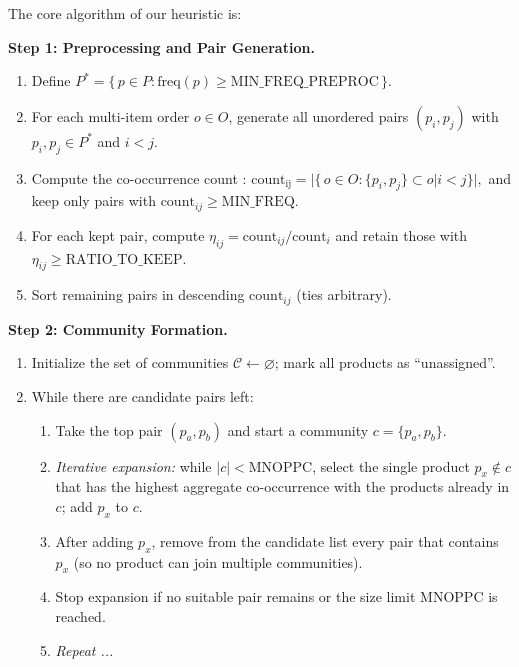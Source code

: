 \documentclass[preprint,review,11pt,authoryear]{elsarticle}
\begin{document}
\noindent The core algorithm of our heuristic is:

\begin{algorithm}[H]
\caption{Algorithm 1: Greedy Product Clustering and Station Assignment (CSLAP)}
\label{alg:greedy-cslap}
\begin{algorithmic}[1]

\Statex \textbf{Step 1: Preprocessing and Pair Generation.}
\begin{enumerate}[label=(\alph*)]
\item Define $P^*=\{\,p\in P:\mathrm{freq}(p)\ge \mathrm{MIN\_FREQ\_PREPROC}\,\}$.
\item For each multi-item order $o\in O$, generate all unordered pairs $(p_i,p_j)$ with $p_i,p_j\in P^*$ and $i<j$.
\item Compute the co-occurrence count : \(\mathrm{count_{ij}} = \big|\{\,o \in O : \{p_i,p_j\} \subset o | i < j \}\big|, \)
and keep only pairs with $\mathrm{count}_{ij}\ge \mathrm{MIN\_FREQ}$.
\item For each kept pair, compute $\eta_{ij}=\mathrm{count}_{ij}/\mathrm{count}_i$ and retain those with $\eta_{ij}\ge \mathrm{RATIO\_TO\_KEEP}$.
\item Sort remaining pairs in descending $\mathrm{count}_{ij}$ (ties arbitrary).
\end{enumerate}
\medskip
\textbf{Step 2: Community Formation.}
\begin{enumerate}[label=(\alph*)]
\item Initialize the set of communities $\mathcal{C}\leftarrow\varnothing$; mark all products as “unassigned”.
\item While there are candidate pairs left:
  \begin{enumerate}[label*=\arabic*.]
  \item Take the top pair $(p_a,p_b)$ and start a community $c=\{p_a,p_b\}$.
  \item \emph{Iterative expansion:} while $|c|<\mathrm{MNOPPC}$, select the single product \(p_x\notin c\) that has the highest aggregate co-occurrence with the products already in \(c\); add  \(p_x\) to \(c\).
  \item After adding $p_x$, remove from the candidate list every pair that contains $p_x$ (so no product can join multiple communities).
  \item Stop expansion if no suitable pair remains or the size limit $\mathrm{MNOPPC}$ is reached.
  \item \textit{Repeat ...}
  \end{enumerate}
\end{enumerate}
\end{algorithmic}
\end{algorithm}
\end{document}
